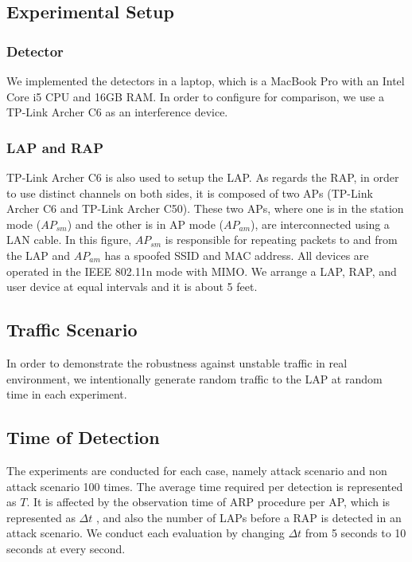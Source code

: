 \documentclass[conference]{IEEEtran}
\begin{document}
\subsection{Experimental Setup}
\subsubsection{Detector}
We implemented the detectors in a laptop, which is a MacBook Pro with an Intel Core i5 CPU and 16GB RAM.
In order to configure \cite{previous} for comparison, we use a TP-Link Archer C6 as an interference device.

\subsubsection{LAP and RAP}
TP-Link Archer C6 is also used to setup the LAP.
As regards the RAP, in order to use distinct channels on both sides, it is composed of two APs (TP-Link Archer C6 and TP-Link Archer C50).
These two APs, where one is in the station mode ($AP_{sm}$) and the other is in AP mode ($AP_{am}$), are interconnected using a LAN cable.
In this figure, $AP_{sm}$ is responsible for repeating packets to and from the LAP and $AP_{am}$ has a spoofed SSID and MAC address.
All devices are operated in the IEEE 802.11n mode with MIMO.
We arrange a LAP, RAP, and user device at equal intervals and it is about 5 feet.

\subsection{Traffic Scenario}
In order to demonstrate the robustness against unstable traffic in real environment, we intentionally generate random traffic to the LAP at random time in each experiment.

\subsection{Time of Detection}
The experiments are conducted for each case, namely attack scenario and non attack scenario 100 times.
The average time required per detection is represented as $T$.
It is affected by the observation time of ARP procedure per AP, which is represented as $\Delta t$ , and also the number of LAPs before a RAP is detected in an attack scenario.
We conduct each evaluation by changing $\Delta t$ from 5 seconds to 10 seconds at every second.
\end{document}
